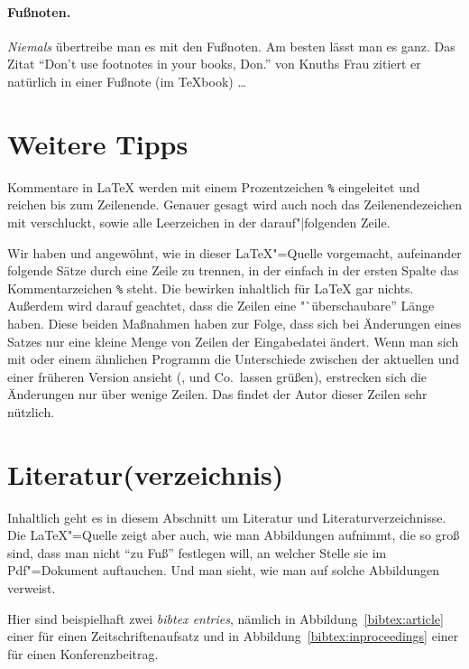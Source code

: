 \paragraph{Fußnoten.} \emph{Niemals}
%
übertreibe man es mit den Fußnoten.
%
Am besten lässt man es ganz.
%
Das Zitat "`Don't use footnotes in your books, Don."' von Knuths Frau zitiert
er natürlich in einer Fußnote (im \TeX book) \dots

\section{Weitere Tipps}
\label{sec:tipps}

Kommentare in \LaTeX{} werden mit einem Prozentzeichen \verb|%| eingeleitet
und reichen bis zum Zeilenende.
% 
Genauer gesagt wird auch noch das Zeilenendezeichen mit verschluckt, sowie
alle Leerzeichen in der darauf"|folgenden Zeile.

Wir haben und angewöhnt, wie in dieser \LaTeX"=Quelle vorgemacht, aufeinander
folgende Sätze durch eine Zeile zu trennen, in der einfach in der ersten
Spalte das Kommentarzeichen \verb|%| steht.
%
Die bewirken inhaltlich für \LaTeX{} gar nichts.
%
Außerdem wird darauf geachtet, dass die Zeilen eine "`überschaubare'' Länge
haben.
%
Diese beiden Maßnahmen haben zur Folge, dass sich bei Änderungen eines Satzes
nur eine kleine Menge von Zeilen der Eingabedatei ändert.
%
Wenn man sich mit  oder einem ähnlichen Programm die
Unterschiede \zB zwischen der aktuellen und einer früheren Version ansieht
(,  und Co.~lassen grüßen), erstrecken sich
die Änderungen nur über wenige Zeilen.
%
Das findet der Autor dieser Zeilen sehr nützlich.

\section{Literatur(verzeichnis)}
\label{sec:literatur}

Inhaltlich geht es in diesem Abschnitt um Literatur und
Literaturverzeichnisse.
%
Die \LaTeX"=Quelle zeigt aber auch, wie man Abbildungen aufnimmt, die so groß
sind, dass man nicht "`zu Fuß"' festlegen will, an welcher Stelle sie im
Pdf"=Dokument auftauchen.
%
Und man sieht, wie man auf solche Abbildungen verweist.

Hier sind beispielhaft zwei \emph{bibtex entries}, nämlich in
Abbildung~\ref{bibtex:article} einer für einen Zeitschriftenaufsatz und in
Abbildung~\ref{bibtex:inproceedings} einer für einen Konferenzbeitrag.

